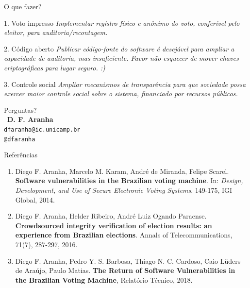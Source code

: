\documentclass[10pt]{beamer}
\begin{document}
\begin{frame}{O que fazer?}
\begin{block}{1. Voto impresso}
\it Implementar registro físico e anônimo do voto, conferível pelo eleitor, para auditoria/recontagem. 
\end{block}

\bigskip

\begin{block}{2. Código aberto}
\it Publicar código-fonte do \emph{software} é desejável para ampliar a capacidade de auditoria, mas insuficiente. Favor não esquecer de mover chaves criptográficas para lugar seguro. :)
\end{block}

\bigskip

\begin{block}{3. Controle social}
\it Ampliar mecanismos de transparência para que sociedade possa exercer maior controle social sobre o sistema, financiado por recursos públicos.
\end{block}
\end{frame}

\begin{frame}[standout]
\begin{center}
{\LARGE \alert{Perguntas?}}\\\
{\bf D. F. Aranha}\\
\texttt{dfaranha@ic.unicamp.br}\\
\texttt{@dfaranha}
\end{center}
\end{frame}

\begin{frame}{Referências}

\begin{enumerate}
 \item Diego F. Aranha, Marcelo M. Karam, André de Miranda, Felipe Scarel.
 \textbf{Software vulnerabilities in the Brazilian voting machine}.
In: \emph{Design, Development, and Use of Secure Electronic Voting Systems}, 149-175, IGI Global, 2014.
\item Diego F. Aranha, Helder Ribeiro, André Luiz Ogando Paraense.
\textbf{Crowdsourced integrity verification of election results: an experience from Brazilian elections}.
Annals of Telecommunications, 71(7), 287-297, 2016.
\item Diego F. Aranha, Pedro Y. S. Barbosa, Thiago N. C. Cardoso, Caio Lüders de Araújo, Paulo Matias. \textbf{The Return of Software Vulnerabilities in the Brazilian Voting Machine}, Relatório Técnico, 2018.
\end{enumerate}


\end{frame}
\end{document}
